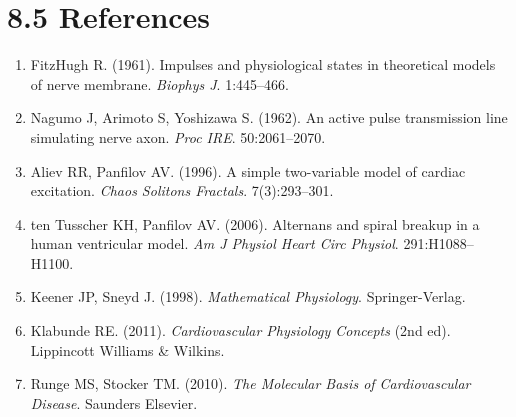 \documentclass[12pt,oneside,a4paper]{book}
\begin{document}
\section{8.5 References}

\begin{enumerate}
  \item FitzHugh R. (1961). Impulses and physiological states in theoretical models of nerve membrane. \textit{Biophys J}. 1:445--466.
  
  \item Nagumo J, Arimoto S, Yoshizawa S. (1962). An active pulse transmission line simulating nerve axon. \textit{Proc IRE}. 50:2061--2070.
  
  \item Aliev RR, Panfilov AV. (1996). A simple two-variable model of cardiac excitation. \textit{Chaos Solitons Fractals}. 7(3):293--301.
  
  \item ten Tusscher KH, Panfilov AV. (2006). Alternans and spiral breakup in a human ventricular model. \textit{Am J Physiol Heart Circ Physiol}. 291:H1088--H1100.
  
  \item Keener JP, Sneyd J. (1998). \textit{Mathematical Physiology}. Springer-Verlag.
  
  \item Klabunde RE. (2011). \textit{Cardiovascular Physiology Concepts} (2nd ed). Lippincott Williams \& Wilkins.
  
  \item Runge MS, Stocker TM. (2010). \textit{The Molecular Basis of Cardiovascular Disease}. Saunders Elsevier.
\end{enumerate}
\end{document}
